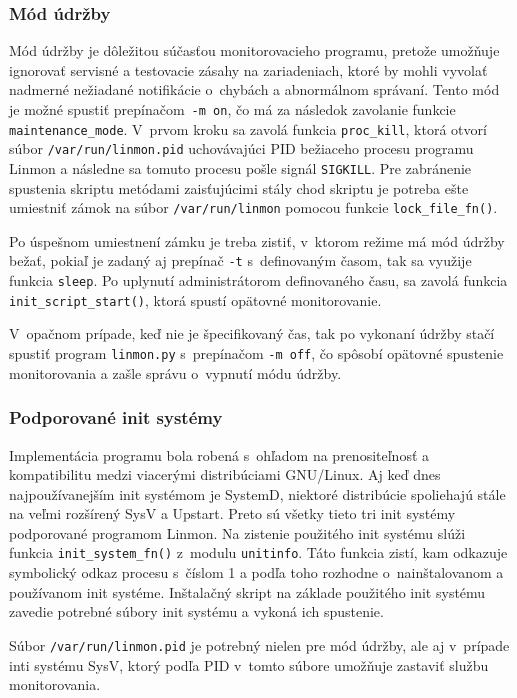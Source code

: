 \subsubsection*{Mód údržby}
Mód údržby je dôležitou súčasťou monitorovacieho programu, pretože umožňuje ignorovať servisné a testovacie zásahy na zariadeniach, ktoré by mohli vyvolať nadmerné nežiadané notifikácie o~chybách a abnormálnom správaní. Tento mód je možné spustiť \hbox{prepínačom \texttt{-m on}}, čo má za následok zavolanie funkcie \texttt{maintenance\_mode}. V~prvom kroku sa zavolá funkcia \texttt{proc\_kill}, ktorá otvorí súbor \texttt{/var/run/linmon.pid} uchovávajúci PID bežiaceho procesu programu Linmon a následne sa tomuto procesu pošle signál \texttt{SIGKILL}. Pre zabránenie spustenia skriptu metódami zaisťujúcimi stály chod skriptu je potreba ešte umiestniť zámok na súbor \texttt{/var/run/linmon} pomocou funkcie \texttt{lock\_file\_fn()}.

Po úspešnom umiestnení zámku je treba zistiť, v~ktorom režime má mód údržby bežať, pokiaľ je zadaný aj prepínač \texttt{-t} s~definovaným časom, tak sa využije funkcia \texttt{sleep}. Po uplynutí administrátorom definovaného času, sa zavolá funkcia \texttt{init\_script\_start()}, ktorá spustí opätovné monitorovanie.

V~opačnom prípade, keď nie je špecifikovaný čas, tak po vykonaní údržby stačí spustiť program \texttt{linmon.py} s~prepínačom \texttt{-m off}, čo spôsobí opätovné spustenie monitorovania a zašle správu o~vypnutí módu údržby.

\subsubsection*{Podporované init systémy}
\label{podpor_init}
Implementácia programu bola robená s~ohľadom na prenositeľnosť a kompatibilitu medzi viacerými distribúciami GNU/Linux. Aj keď dnes najpoužívanejším init systémom je SystemD, niektoré distribúcie spoliehajú stále na veľmi rozšírený SysV a Upstart. Preto sú všetky tieto tri init systémy podporované programom Linmon. Na zistenie použitého init systému slúži funkcia \texttt{init\_system\_fn()} z~modulu \texttt{unitinfo}. Táto funkcia zistí, kam odkazuje symbolický odkaz procesu s~číslom 1 a podľa toho rozhodne o~nainštalovanom a používanom init systéme. Inštalačný skript na základe použitého init systému zavedie potrebné súbory init systému a vykoná ich spustenie.

Súbor \texttt{/var/run/linmon.pid} je potrebný nielen pre mód údržby, ale aj v~prípade inti systému SysV, ktorý podľa PID v~tomto súbore umožňuje zastaviť službu monitorovania.

